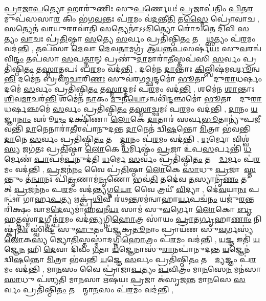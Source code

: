 \ul{𑌪𑍍𑌰𑌾}\ul{𑌜𑌾}\ul{𑌪}𑌤𑍍𑌯𑍋 𑌹𑌾𑌰𑍁॑𑌣𑌿𑌃 𑌸𑍁\ul{𑌪}𑌰𑍍𑌣𑍇𑌯𑌃॑ \ul{𑌪𑍍𑌰}𑌜𑌾𑌪॑𑌤𑌿𑌂 \ul{𑌪𑌿}𑌤\ul{𑌰}𑌮𑍁𑌪॑𑌸𑌸𑌾\ul{𑌰} 𑌕𑌿𑌂 𑌭॑𑌗\ul{𑌵}𑌨𑍍𑌤𑌃 𑌪॑\ul{𑌰}𑌮𑌂 𑌵॑\ul{𑌦}𑌨𑍍𑌤𑍀\ul{𑌤𑌿} 𑌤\ul{𑌸𑍍𑌮𑍈} 𑌪𑍍𑌰𑍋॑𑌵𑌾𑌚 \sep
\ul{𑌸}𑌤𑍍𑌯𑍇𑌨॑ \ul{𑌵𑌾}𑌯𑍁𑌰𑌾𑌵𑌾॑𑌤𑌿 \ul{𑌸}𑌤𑍍𑌯𑍇𑌨𑌾॑𑌽𑌽\ul{𑌦𑌿}𑌤𑍍𑌯𑍋 𑌰𑍋॑𑌚𑌤𑍇 \ul{𑌦𑌿}𑌵𑌿 \ul{𑌸}𑌤𑍍𑌯𑌂 \ul{𑌵𑌾}𑌚𑌃 𑌪𑍍𑌰॑\ul{𑌤𑌿}𑌷𑍍𑌠𑌾 \ul{𑌸}𑌤𑍍𑌯𑍇 \ul{𑌸}𑌰𑍍𑌵𑌂 𑌪𑍍𑌰𑌤𑌿॑𑌷𑍍𑌠𑌿\ul{𑌤𑌂} 𑌤𑌸𑍍𑌮𑌾᳚\ul{𑌥𑍍𑌸}𑌤𑍍𑌯𑌂 𑌪॑\ul{𑌰}𑌮𑌂 𑌵𑌦॑\ul{𑌨𑍍𑌤𑌿} \sep
𑌤𑌪॑𑌸𑌾 \ul{𑌦𑍇}𑌵𑌾 \ul{𑌦𑍇}𑌵\ul{𑌤𑌾}𑌮𑌗𑍍𑌰॑ 𑌆\ul{𑌯}𑌨𑍍𑌤\ul{𑌪}𑌸𑌰𑍍\mbox{}𑌷॑\ul{𑌯𑌃} 𑌸𑍁\ul{𑌵}𑌰𑌨𑍍𑌵॑𑌵𑌿\ul{𑌨𑍍𑌦𑌂} 𑌤𑌪॑𑌸𑌾 \ul{𑌸}𑌪\ul{𑌤𑍍𑌨𑌾}𑌨𑍍 𑌪𑍍𑌰𑌣𑍁॑\ul{𑌦𑌾}𑌮𑌾𑌰𑌾॑\ul{𑌤𑍀}𑌸𑍍𑌤𑌪॑𑌸𑌿 \ul{𑌸}𑌰𑍍𑌵𑌂 𑌪𑍍𑌰𑌤𑌿॑𑌷𑍍𑌠𑌿\ul{𑌤𑌂} 𑌤\ul{𑌸𑍍𑌮𑌾}𑌤𑍍𑌤𑌪𑌃॑ 𑌪\ul{𑌰}𑌮𑌂 𑌵𑌦॑\ul{𑌨𑍍𑌤𑌿} \sep
𑌦𑌮𑍇॑𑌨 \ul{𑌦𑌾}𑌨𑍍𑌤𑌾𑌃 \ul{𑌕𑌿}𑌲𑍍𑌬𑌿𑌷॑𑌮𑌵\ul{𑌧𑍂}𑌨𑍍𑌵\ul{𑌨𑍍𑌤𑌿} 𑌦𑌮𑍇॑𑌨 𑌬𑍍𑌰𑌹𑍍𑌮\ul{𑌚𑌾}𑌰𑌿\ul{𑌣𑌃} 𑌸𑍁𑌵॑𑌰𑌗\ul{𑌚𑍍𑌛}𑌨𑍍𑌦𑌮𑍋॑ \ul{𑌭𑍂}𑌤𑌾𑌨𑌾𑌂᳚ 𑌦𑍁\ul{𑌰𑌾}𑌧𑌰𑍍\mbox{}\ul{𑌷𑌂} 𑌦𑌮𑍇॑ \ul{𑌸}𑌰𑍍𑌵𑌂 𑌪𑍍𑌰𑌤𑌿॑𑌷𑍍𑌠𑌿\ul{𑌤𑌂} 𑌤\ul{𑌸𑍍𑌮𑌾}𑌦𑍍𑌦𑌮𑌃॑ 𑌪\ul{𑌰}𑌮𑌂 𑌵𑌦॑\ul{𑌨𑍍𑌤𑌿} \sep
𑌶𑌮𑍇॑𑌨 \ul{𑌶𑌾}𑌨𑍍𑌤𑌾𑌃  \ul{𑌶𑌿}𑌵\ul{𑌮𑌾}𑌚𑌰॑\ul{𑌨𑍍𑌤𑌿} 𑌶𑌮𑍇॑𑌨 \ul{𑌨𑌾}𑌕𑌂 \ul{𑌮𑍁}𑌨\ul{𑌯𑍋}𑌽𑌨𑍍𑌵𑌵𑌿॑\ul{𑌨𑍍𑌦}𑌞𑍍𑌛𑌮𑍋॑ \ul{𑌭𑍂}𑌤𑌾𑌨𑌾𑌂᳚ 𑌦𑍁\ul{𑌰𑌾}𑌧𑌰𑍍\mbox{}\ul{𑌷}𑌞𑍍𑌛𑌮𑍇॑ \ul{𑌸}𑌰𑍍𑌵𑌂 𑌪𑍍𑌰𑌤𑌿॑𑌷𑍍𑌠𑌿\ul{𑌤𑌂} 𑌤\ul{𑌸𑍍𑌮𑌾}𑌚𑍍𑌛𑌮𑌃॑ 𑌪\ul{𑌰}𑌮𑌂 𑌵𑌦॑𑌨𑍍𑌤𑌿 \sep
\ul{𑌦𑌾}𑌨𑌂 \ul{𑌯}𑌜𑍍𑌞𑌾\ul{𑌨𑌾𑌂} 𑌵𑌰𑍂॑\ul{𑌥𑌂} 𑌦𑌕𑍍𑌷𑌿॑𑌣𑌾 \ul{𑌲𑍋}𑌕𑍇 \ul{𑌦𑌾}𑌤𑌾𑌰॑ 𑌸𑌰𑍍𑌵\ul{𑌭𑍂}𑌤𑌾𑌨𑍍𑌯𑍁॑𑌪\ul{𑌜𑍀}𑌵𑌨𑍍𑌤𑌿॑ \ul{𑌦𑌾}𑌨𑍇𑌨𑌾𑌰𑌾॑\ul{𑌤𑍀}𑌰𑌪𑌾॑𑌨𑍁𑌦𑌨𑍍𑌤 \ul{𑌦𑌾}𑌨𑍇𑌨॑ 𑌦𑍍𑌵𑌿\ul{𑌷}𑌨𑍍𑌤𑍋 \ul{𑌮𑌿}𑌤𑍍𑌰𑌾 𑌭॑𑌵𑌨𑍍𑌤𑌿 \ul{𑌦𑌾}𑌨𑍇 \ul{𑌸}𑌰𑍍𑌵𑌂 𑌪𑍍𑌰𑌤𑌿॑𑌷𑍍𑌠𑌿\ul{𑌤𑌂} 𑌤𑌸𑍍𑌮𑌾᳚\ul{𑌦𑍍𑌦𑌾}𑌨𑌂 𑌪॑\ul{𑌰}𑌮𑌂 𑌵𑌦॑𑌨𑍍𑌤𑌿 \sep
\ul{𑌧}𑌰𑍍𑌮𑍋 𑌵𑌿𑌶𑍍𑌵॑\ul{𑌸𑍍𑌯} 𑌜𑌗॑𑌤𑌃 𑌪𑍍𑌰\ul{𑌤𑌿}𑌷𑍍𑌠𑌾 \ul{𑌲𑍋}𑌕𑍇 \ul{𑌧}𑌰𑍍𑌮𑌿𑌷𑍍𑌠𑌂॑ \ul{𑌪𑍍𑌰}𑌜𑌾 𑌉॑𑌪\ul{𑌸}𑌰𑍍𑌪𑌨𑍍𑌤𑌿॑ \ul{𑌧}𑌰𑍍𑌮𑍇𑌣॑ \ul{𑌪𑌾}𑌪𑌮॑\ul{𑌪}𑌨𑍁𑌦॑𑌤𑌿 \ul{𑌧}𑌰𑍍𑌮𑍇 \ul{𑌸}𑌰𑍍𑌵𑌂 𑌪𑍍𑌰𑌤𑌿॑𑌷𑍍𑌠𑌿\ul{𑌤𑌂} 𑌤𑌸𑍍𑌮𑌾᳚\ul{𑌦𑍍𑌧}𑌰𑍍𑌮𑌂 𑌪॑\ul{𑌰}𑌮𑌂 𑌵𑌦॑𑌨𑍍𑌤𑌿 \sep
\ul{𑌪𑍍𑌰}𑌜𑌨॑\ul{𑌨𑌂} 𑌵𑍈 𑌪𑍍𑌰॑\ul{𑌤𑌿}𑌷𑍍𑌠𑌾 \ul{𑌲𑍋}𑌕𑍇 \ul{𑌸𑌾}𑌧𑍁 \ul{𑌪𑍍𑌰}𑌜𑌾𑌯𑌾᳚\ul{𑌸𑍍𑌤}𑌨𑍍𑌤𑍁𑌂 𑌤॑\ul{𑌨𑍍𑌵𑌾}𑌨𑌃 𑌪𑌿॑\ul{𑌤𑍃}𑌣𑌾𑌮॑\ul{𑌨𑍃}𑌣𑍋 𑌭𑌵॑\ul{𑌤𑌿} 𑌤𑌦𑍇॑𑌵 \ul{𑌤}𑌸𑍍𑌯𑌾𑌨𑍃॑\ul{𑌣𑌂} 𑌤𑌸𑍍𑌮𑌾᳚𑌤𑍍 \ul{𑌪𑍍𑌰}𑌜𑌨॑𑌨𑌂 𑌪\ul{𑌰}𑌮𑌂 𑌵𑌦॑\ul{𑌨𑍍𑌤𑍍𑌯}𑌗𑍍𑌨\ul{𑌯𑍋} 𑌵𑍈 𑌤𑍍𑌰𑌯𑍀॑ \ul{𑌵𑌿}𑌦𑍍𑌯𑌾 \sep
 𑌦𑍇॑\ul{𑌵}𑌯𑌾\ul{𑌨𑌃} 𑌪𑌨𑍍𑌥𑌾॑ 𑌗𑌾𑌰𑍍\mbox{}𑌹\ul{𑌪}𑌤𑍍𑌯 𑌋𑌕𑍍𑌪𑍃॑\ul{𑌥𑌿}𑌵𑍀 𑌰॑𑌥\ul{𑌨𑍍𑌤}𑌰𑌮॑𑌨𑍍𑌵𑌾𑌹𑌾\ul{𑌰𑍍𑌯}𑌪𑌚॑\ul{𑌨𑌂} 𑌯𑌜𑍁॑\ul{𑌰}𑌨𑍍𑌤𑌰𑌿॑𑌕𑍍𑌷𑌂 𑌵𑌾𑌮\ul{𑌦𑍇}𑌵𑍍𑌯𑌮𑌾॑𑌹\ul{𑌵}𑌨𑍀\ul{𑌯𑌃} 𑌸𑌾𑌮॑ 𑌸𑍁\ul{𑌵}𑌰𑍍𑌗𑍋 \ul{𑌲𑍋}𑌕𑍋 \ul{𑌬𑍃}𑌹𑌤𑍍𑌤𑌸𑍍𑌮𑌾॑\ul{𑌦}𑌗𑍍𑌨𑍀𑌨𑍍𑌪॑\ul{𑌰}𑌮𑌂 𑌵𑌦॑𑌨𑍍𑌤𑍍𑌯𑌗𑍍𑌨𑌿\ul{𑌹𑍋}𑌤𑍍𑌰 𑌸𑌾॑𑌯𑌂 \ul{𑌪𑍍𑌰𑌾}𑌤\ul{𑌰𑍍𑌗𑍃}𑌹𑌾\ul{𑌣𑌾𑌂} 𑌨𑌿𑌷𑍍𑌕𑍃॑\ul{𑌤𑌿𑌃} 𑌸𑍍𑌵𑌿॑𑌷𑍍𑌟 𑌸𑍁\ul{𑌹𑍁}𑌤𑌂 𑌯॑𑌜𑍍𑌞𑌕𑍍𑌰\ul{𑌤𑍂}𑌨𑌾𑌂 𑌪𑍍𑌰𑌾𑌯॑𑌣 𑌸𑍁\ul{𑌵}𑌰𑍍𑌗𑌸𑍍𑌯॑ \ul{𑌲𑍋}𑌕\ul{𑌸𑍍𑌯} 𑌜𑍍𑌯𑍋\ul{𑌤𑌿}𑌸𑍍𑌤𑌸𑍍𑌮𑌾॑𑌦𑌗𑍍𑌨𑌿\ul{𑌹𑍋}𑌤𑍍𑌰𑌂 𑌪॑\ul{𑌰}𑌮𑌂 𑌵𑌦॑𑌨𑍍𑌤𑌿 \sep
 \ul{𑌯}𑌜𑍍𑌞 𑌇𑌤𑌿॑ \ul{𑌯}𑌜𑍍𑌞𑍇\ul{𑌨} 𑌹𑌿 \ul{𑌦𑍇}𑌵𑌾 𑌦𑌿𑌵𑌂॑ \ul{𑌗}𑌤𑌾 \ul{𑌯}𑌜𑍍𑌞𑍇𑌨𑌾𑌸𑍁॑\ul{𑌰𑌾}𑌨𑌪𑌾॑𑌨𑍁𑌦𑌨𑍍𑌤 \ul{𑌯}𑌜𑍍𑌞𑍇𑌨॑ 𑌦𑍍𑌵𑌿\ul{𑌷}𑌨𑍍𑌤𑍋 \ul{𑌮𑌿}𑌤𑍍𑌰𑌾 𑌭॑𑌵𑌨𑍍𑌤𑌿 \ul{𑌯}𑌜𑍍𑌞𑍇 \ul{𑌸}𑌰𑍍𑌵𑌂 𑌪𑍍𑌰𑌤𑌿॑𑌷𑍍𑌠𑌿\ul{𑌤𑌂} 𑌤𑌸𑍍𑌮𑌾᳚\ul{𑌦𑍍𑌯}𑌜𑍍𑌞𑌂 𑌪॑\ul{𑌰}𑌮𑌂 𑌵𑌦॑𑌨𑍍𑌤𑌿 \sep 
 𑌮𑌾\ul{𑌨}𑌸𑌂 𑌵𑍈 𑌪𑍍𑌰𑌾॑𑌜𑌾\ul{𑌪}𑌤𑍍𑌯𑌂 \ul{𑌪}𑌵𑌿𑌤𑍍𑌰𑌂॑ 𑌮𑌾\ul{𑌨}𑌸𑍇\ul{𑌨} 𑌮𑌨॑𑌸𑌾 \ul{𑌸𑌾}𑌧𑍁 𑌪॑𑌶𑍍𑌯𑌤𑌿 𑌮𑌾\ul{𑌨}𑌸𑌾 𑌋𑌷॑𑌯𑌃 \ul{𑌪𑍍𑌰}𑌜𑌾 𑌅॑𑌸𑍃𑌜𑌨𑍍𑌤 𑌮𑌾\ul{𑌨}𑌸𑍇 \ul{𑌸}𑌰𑍍𑌵𑌂 𑌪𑍍𑌰𑌤𑌿॑𑌷𑍍𑌠𑌿\ul{𑌤𑌂} 𑌤𑌸𑍍𑌮𑌾᳚𑌨𑍍𑌮𑌾\ul{𑌨}𑌸𑌂 𑌪॑\ul{𑌰}𑌮𑌂 𑌵𑌦॑𑌨𑍍𑌤𑌿 \sep
